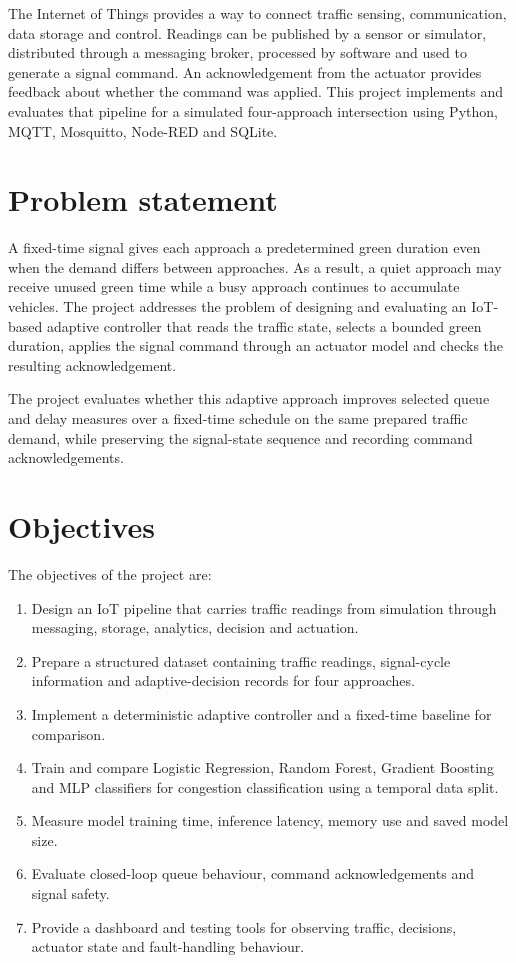 \documentclass[12pt,a4paper,oneside]{report}
\begin{document}
The Internet of Things provides a way to connect traffic sensing, communication, data storage and control. Readings can be published by a sensor or simulator, distributed through a messaging broker, processed by software and used to generate a signal command. An acknowledgement from the actuator provides feedback about whether the command was applied. This project implements and evaluates that pipeline for a simulated four-approach intersection using Python, MQTT, Mosquitto, Node-RED and SQLite.

\section{Problem statement}
A fixed-time signal gives each approach a predetermined green duration even when the demand differs between approaches. As a result, a quiet approach may receive unused green time while a busy approach continues to accumulate vehicles. The project addresses the problem of designing and evaluating an IoT-based adaptive controller that reads the traffic state, selects a bounded green duration, applies the signal command through an actuator model and checks the resulting acknowledgement.

The project evaluates whether this adaptive approach improves selected queue and delay measures over a fixed-time schedule on the same prepared traffic demand, while preserving the signal-state sequence and recording command acknowledgements.

\section{Objectives}
The objectives of the project are:
\begin{enumerate}
  \item Design an IoT pipeline that carries traffic readings from simulation through messaging, storage, analytics, decision and actuation.
  \item Prepare a structured dataset containing traffic readings, signal-cycle information and adaptive-decision records for four approaches.
  \item Implement a deterministic adaptive controller and a fixed-time baseline for comparison.
  \item Train and compare Logistic Regression, Random Forest, Gradient Boosting and MLP classifiers for congestion classification using a temporal data split.
  \item Measure model training time, inference latency, memory use and saved model size.
  \item Evaluate closed-loop queue behaviour, command acknowledgements and signal safety.
  \item Provide a dashboard and testing tools for observing traffic, decisions, actuator state and fault-handling behaviour.
\end{enumerate}
\end{document}
